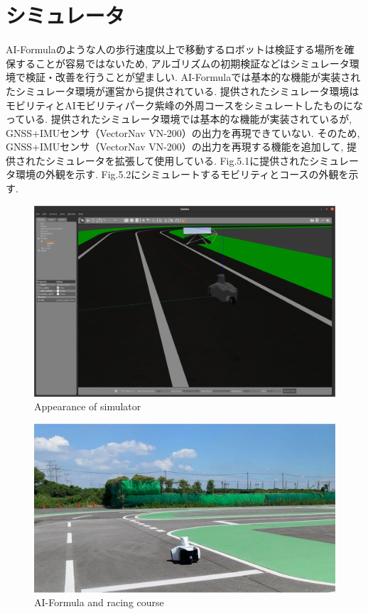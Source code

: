 
\section{シミュレータ}
AI-Formulaのような人の歩行速度以上で移動するロボットは検証する場所を確保することが容易ではないため, アルゴリズムの初期検証などはシミュレータ環境で検証・改善を行うことが望ましい.
AI-Formulaでは基本的な機能が実装されたシミュレータ環境が運営から提供されている.
提供されたシミュレータ環境はモビリティとAIモビリティパーク紫峰の外周コースをシミュレートしたものになっている.
提供されたシミュレータ環境では基本的な機能が実装されているが, GNSS+IMUセンサ（VectorNav VN-200）の出力を再現できていない.
そのため, GNSS+IMUセンサ（VectorNav VN-200）の出力を再現する機能を追加して, 提供されたシミュレータを拡張して使用している.\cite{aifomrula-sim-chibakou}
Fig.5.1に提供されたシミュレータ環境の外観を示す.
Fig.5.2にシミュレートするモビリティとコースの外観を示す.

\begin{figure}[H]
  \centering
 \includegraphics[keepaspectratio, scale=0.2]
      {images/simulator.png}
 \caption{Appearance of simulator}
 \label{fig:simulator}
\end{figure}

\begin{figure}[H]
  \centering
 \includegraphics[keepaspectratio, scale=0.2]
      {images/realworld.png}
 \caption{AI-Formula and racing course}
 \label{fig:simulator}
\end{figure}

